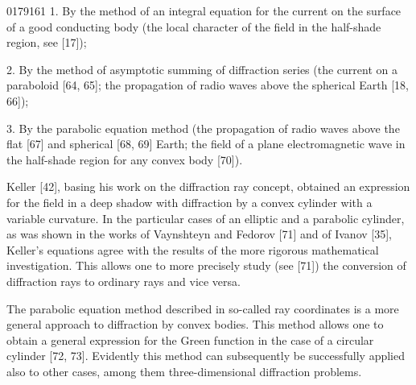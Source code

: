 \begin{scanpage}{0179}{161}
1. By the method of an integral equation for the current on the surface of a good conducting body (the local character of the field in the half-shade region, see [17]);

2. By the method of asymptotic summing of diffraction series (the current on a paraboloid [64, 65]; the propagation of radio waves above the spherical Earth [18, 66]);

3. By the parabolic equation method (the propagation of radio waves above the flat [67] and spherical [68, 69] Earth; the field of a plane electromagnetic wave in the half-shade region for any convex body [70]).

Keller [42], basing his work on the diffraction ray concept, obtained an expression for the field in a deep shadow with diffraction by a convex cylinder with a variable curvature. In the particular cases of an elliptic and a parabolic cylinder, as was shown in the works of Vaynshteyn and Fedorov [71] and of Ivanov [35], Keller's equations agree with the results of the more rigorous mathematical investigation. This allows one to more precisely study (see [71]) the conversion of diffraction rays to ordinary rays and vice versa.

The parabolic equation method described in so-called ray coordinates is a more general approach to diffraction by convex bodies. This method allows one to obtain a general expression for the Green function in the case of a circular cylinder [72, 73]. Evidently this method can subsequently be successfully applied also to other cases, among them three-dimensional diffraction problems.
\end{scanpage}
